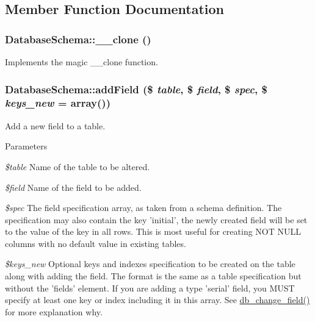\subsection{Member Function Documentation}
\hypertarget{classDatabaseSchema_a31371e9f44ef54d75fce3746b83a5d76}{
\subsubsection[{\_\-\_\-clone}]{\setlength{\rightskip}{0pt plus 5cm}DatabaseSchema::\_\-\_\-clone ()}}
\label{classDatabaseSchema_a31371e9f44ef54d75fce3746b83a5d76}
Implements the magic \_\-\_\-clone function. \hypertarget{classDatabaseSchema_a54800af6c4094cea196e1c66b5106c99}{
\subsubsection[{addField}]{\setlength{\rightskip}{0pt plus 5cm}DatabaseSchema::addField (\$ {\em table}, \/  \$ {\em field}, \/  \$ {\em spec}, \/  \$ {\em keys\_\-new} = {\ttfamily array()})}}
\label{classDatabaseSchema_a54800af6c4094cea196e1c66b5106c99}
Add a new field to a table.


\begin{DoxyParams}{Parameters}
\item[{\em \$table}]Name of the table to be altered. \item[{\em \$field}]Name of the field to be added. \item[{\em \$spec}]The field specification array, as taken from a schema definition. The specification may also contain the key 'initial', the newly created field will be set to the value of the key in all rows. This is most useful for creating NOT NULL columns with no default value in existing tables. \item[{\em \$keys\_\-new}]Optional keys and indexes specification to be created on the table along with adding the field. The format is the same as a table specification but without the 'fields' element. If you are adding a type 'serial' field, you MUST specify at least one key or index including it in this array. See \hyperlink{group__schemaapi_ga9e0a4211eb8137e187d5f3f4fa716cea}{db\_\-change\_\-field()} for more explanation why.\end{DoxyParams}

